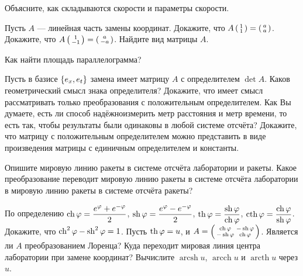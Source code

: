 \documentclass[a4paper,12pt]{article}
\newcommand{\smat}[1]{\hr{\begin{smallmatrix}#1\end{smallmatrix}}}
\newcommand{\мв}{\,м$_в$}
\DeclareMathOperator{\arcsh}{arcsh}
\DeclareMathOperator{\arcch}{arcch}
\DeclareMathOperator{\arcth}{arcth}
\begin{document}
Объясните, как складываются скорости и параметры скорости.


\newpage



Пусть $A$ --- линейная часть замены координат. Докажите, что $A\smat{1\\1} = \smat{a\\a}$.
Докажите, что $A\smat{1\\-1} = \smat{a\\-a}$.
Найдите вид матрицы $A$.

Как найти площадь параллелограмма?

Пусть в базисе $\left\{e_x,e_t\right\}$ замена имеет матрицу $A$ с определителем $\det A$. Каков геометрический смысл знака определителя?
Докажите, что имеет смысл рассматривать только преобразования с положительным определителем.
Как Вы думаете, есть ли способ  надёжно измерить метр расстояния и метр времени, то есть так, чтобы результаты были одинаковы в любой системе отсчёта?
Докажите, что матрицу с положительным определителем можно представить в виде произведения матрицы с единичным определителем и константы.

Опишите мировую линию ракеты в системе отсчёта лаборатории и ракеты.
Какое преобразование переводит мировую линию ракеты в системе отсчёта лаборатории в мировую линию ракеты в системе отсчёта ракеты?




По определению $\ch \ph = \dfrac{e^\ph + e^{-\ph}}{2}$, $\sh \ph = \dfrac{e^\ph - e^{-\ph}}{2}$, $\th\ph = \dfrac{\sh\ph}{\ch\ph}$, $\cth{\ph}=\dfrac{\ch\ph}{\sh\ph}$. Докажите, что $\ch^2\ph - \sh^2\ph = 1$.
Пусть $\th \ph = u$, и $A = \smat{\ch\ph&-\sh\ph\\-\sh\ph&\ch\ph}$. Является ли $A$ преобразованием Лоренца?
Куда переходит мировая линия центра лаборатории при замене координат?
Вычислите $\arcsh u$, $\arcch u$ и $\arcth u$ через $u$.

\vfil\vfil\vfil\vfil\vfil\vfil\vfil\vfil\vfil\vfil\vfil\vfil\vfil\vfil\vfil\vfil\vfil\vfil
\vfil\vfil\vfil\vfil\vfil\vfil\vfil\vfil\vfil\vfil\vfil\vfil\vfil\vfil\vfil\vfil\vfil\vfil\vfil\vfil\vfil\vfil\vfil\vfil\vfil\vfil\vfil\vfil\vfil\vfil\vfil\vfil\vfil\vfil\vfil\vfil
\end{document}
